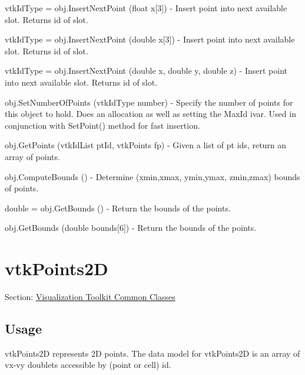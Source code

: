 \begin{DoxyItemize}
\item {\ttfamily vtk\-Id\-Type = obj.\-Insert\-Next\-Point (float x\mbox{[}3\mbox{]})} -\/ Insert point into next available slot. Returns id of slot.  
\item {\ttfamily vtk\-Id\-Type = obj.\-Insert\-Next\-Point (double x\mbox{[}3\mbox{]})} -\/ Insert point into next available slot. Returns id of slot.  
\item {\ttfamily vtk\-Id\-Type = obj.\-Insert\-Next\-Point (double x, double y, double z)} -\/ Insert point into next available slot. Returns id of slot.  
\item {\ttfamily obj.\-Set\-Number\-Of\-Points (vtk\-Id\-Type number)} -\/ Specify the number of points for this object to hold. Does an allocation as well as setting the Max\-Id ivar. Used in conjunction with Set\-Point() method for fast insertion.  
\item {\ttfamily obj.\-Get\-Points (vtk\-Id\-List pt\-Id, vtk\-Points fp)} -\/ Given a list of pt ids, return an array of points.  
\item {\ttfamily obj.\-Compute\-Bounds ()} -\/ Determine (xmin,xmax, ymin,ymax, zmin,zmax) bounds of points.  
\item {\ttfamily double = obj.\-Get\-Bounds ()} -\/ Return the bounds of the points.  
\item {\ttfamily obj.\-Get\-Bounds (double bounds\mbox{[}6\mbox{]})} -\/ Return the bounds of the points.  
\end{DoxyItemize}\hypertarget{vtkcommon_vtkpoints2d}{}\section{vtk\-Points2\-D}\label{vtkcommon_vtkpoints2d}
Section\-: \hyperlink{sec_vtkcommon}{Visualization Toolkit Common Classes} \hypertarget{vtkwidgets_vtkxyplotwidget_Usage}{}\subsection{Usage}\label{vtkwidgets_vtkxyplotwidget_Usage}
vtk\-Points2\-D represents 2\-D points. The data model for vtk\-Points2\-D is an array of vx-\/vy doublets accessible by (point or cell) id.

